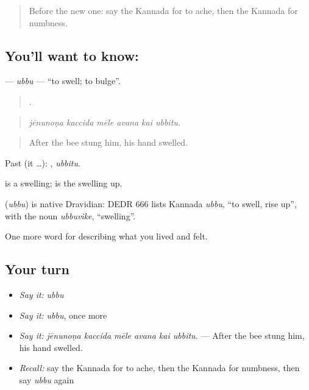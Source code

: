 \label{lesson:KA-C510-ubbu}



\begin{quote}
Before the new one: say the Kannada for to ache, then the Kannada for numbness.
\end{quote}

\subsection*{You'll want to know: }
\textbf{} — \emph{ubbu} — \textquotedblleft{}to swell; to bulge\textquotedblright{}.

\begin{quote}
     .
\end{quote}

\begin{quote}
\emph{jēnunoṇa kaccida mēle avana kai ubbitu.}
\end{quote}

\begin{quote}
After the bee stung him, his hand swelled.
\end{quote}

Past (it …): , \emph{ubbitu}.

 is a swelling;  is the swelling up.

\begin{cousinweb}
\textbf{} (\emph{ubbu}) is native Dravidian: DEDR 666 lists Kannada \emph{ubbu}, \textquotedblleft{}to swell, rise up\textquotedblright{}, with the noun \emph{ubbuvike}, \textquotedblleft{}swelling\textquotedblright{}.
\end{cousinweb}

\begin{grammarlens}[title={What you've built}]
One more word for describing what you lived and felt.
\end{grammarlens}

\subsection*{Your turn}
\begin{itemize}
\raggedright
  \item \emph{Say it:} \emph{ubbu}
  \item \emph{Say it:} \emph{ubbu}, once more
  \item \emph{Say it:} \emph{jēnunoṇa kaccida mēle avana kai ubbitu.} — After the bee stung him, his hand swelled.
  \item \emph{Recall:} say the Kannada for to ache, then the Kannada for numbness, then say \emph{ubbu} again
\end{itemize}


